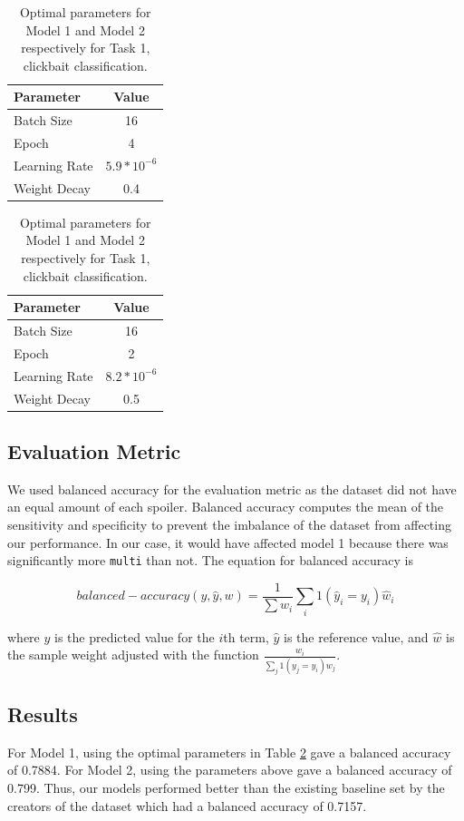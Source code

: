 \documentclass[12pt]{article}
\begin{document}
\begin{table}
\centering
\begin{tabular}{lc}
\toprule
\textbf{Parameter} & \textbf{Value}\\
\midrule
Batch Size & 16 \\
Epoch & 4 \\
Learning Rate & $5.9 * 10^{-6}$ \\ 
Weight Decay & 0.4 \\ 
\bottomrule
\end{tabular}
\begin{tabular}{lc}
\toprule
\textbf{Parameter} & \textbf{Value}\\
\midrule
Batch Size & 16 \\
Epoch & 2 \\
Learning Rate & $ 8.2 * 10^{-6} $ \\ 
Weight Decay & 0.5 \\ 
\bottomrule
\end{tabular}
\caption{Optimal parameters for Model 1 and Model 2 respectively for Task 1, clickbait classification.}
\label{tab:hyperparams_result}
\end{table}

\subsection{Evaluation Metric}
We used balanced accuracy for the evaluation metric as the dataset did not have an equal amount of each spoiler. Balanced accuracy computes the mean of the sensitivity and specificity to prevent the imbalance of the dataset from affecting our performance. In our case, it would have affected model 1 because there was significantly more \verb|multi| than not. The equation for balanced accuracy is

\small{\[balanced-accuracy(y, \hat{y}, w) = \frac{1}{\sum{\hat{w}_i}} \sum_i 1(\hat{y}_i = y_i)\hat{w}_i  \]} \normalsize


where $y$ is the predicted value for the $i$th term, $\hat{y}$ is the reference value, and $\hat{w}$ is the sample weight adjusted with the function $\frac{w_i}{\sum_{j} 1(y_j = y_i)w_j}$. \cite{scikit-learn}
\subsection{Results}
For Model 1, using the optimal parameters in Table \ref{tab:hyperparams_result} gave a balanced accuracy of 0.7884. For Model 2, using the parameters above gave a balanced accuracy of 0.799. Thus, our models performed better than the existing baseline set by the creators of the dataset which had a balanced accuracy of 0.7157.
\end{document}
